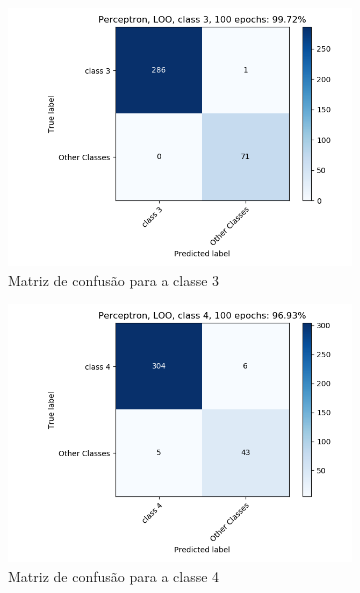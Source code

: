 \documentclass[paper=a4, fontsize=11pt]{scrartcl}
\numberwithin{equation}{section}		%
\numberwithin{figure}{section}			%
\numberwithin{table}{section}				%
\begin{document}
\begin{figure}[h!]
\begin{subfigure}{.5\textwidth}
			\includegraphics[width=\linewidth]{img/q3_fig_loo_classe3.png}
			\caption{Matriz de confusão para a classe 3}
			\label{fig:q1grau4}
		\end{subfigure}%
		\begin{subfigure}{.5\textwidth}
			\centering
			\includegraphics[width=\linewidth]{img/q3_fig_loo_classe4.png}
			\caption{Matriz de confusão para a classe 4}
			\label{fig:q1_grau5}
		\end{subfigure}
		\begin{subfigure}{.5\textwidth}
			\centering

\end{subfigure}
\end{figure}
\end{document}
